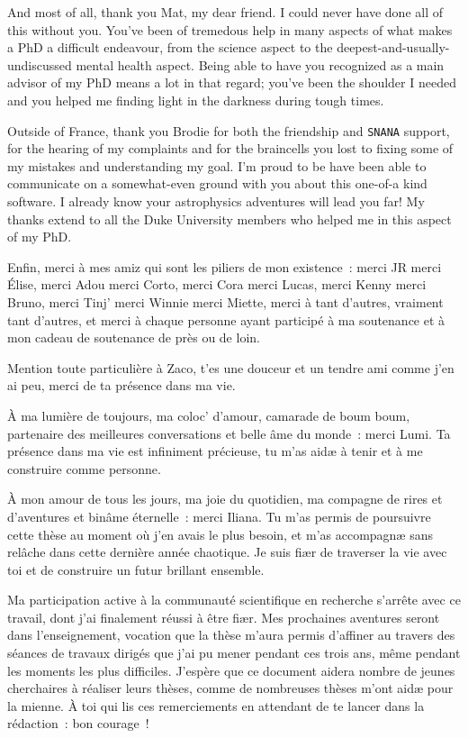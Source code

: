 \documentclass[../main/main.tex]{subfiles}
\begin{document}
And most of all, thank you Mat, my dear friend. I could never have done all of
this without you. You've been of tremedous help in many aspects of what makes a
PhD a difficult endeavour, from the science aspect to the
deepest-and-usually-undiscussed mental health aspect. Being able to have you
recognized as a main advisor of my PhD means a lot in that regard\string; you've
been the shoulder I needed and you helped me finding light in the darkness
during tough times.

Outside of France, thank you Brodie for both the friendship and \texttt{SNANA}
support, for the hearing of my complaints and for the braincells you lost to
fixing some of my mistakes and understanding my goal. I'm proud to be have been
able to communicate on a somewhat-even ground with you about this one-of-a kind
software. I already know your astrophysics adventures will lead you far\string!
My thanks extend to all the Duke University members who helped me in this aspect
of my PhD.

Enfin, merci à mes amiz qui sont les piliers de mon existence~: merci JR merci
Élise, merci Adou merci Corto, merci Cora merci Lucas, merci Kenny merci Bruno,
merci Tinj' merci Winnie merci Miette, merci à tant d'autres, vraiment tant
d'autres, et merci à chaque personne ayant participé à ma soutenance et à mon
cadeau de soutenance de près ou de loin.

Mention toute particulière à Zaco, t'es une douceur et un tendre ami comme j'en
ai peu, merci de ta présence dans ma vie.

\vfill

À ma lumière de toujours, ma coloc' d'amour, camarade de boum boum, partenaire
des meilleures conversations et belle âme du monde~: merci Lumi. Ta présence
dans ma vie est infiniment précieuse, tu m'as aidæ à tenir et à me construire
comme personne.

\vfill

À mon amour de tous les jours, ma joie du quotidien, ma compagne de rires et
d'aventures et binâme éternelle~: merci Iliana. Tu m'as permis de poursuivre
cette thèse au moment où j'en avais le plus besoin, et m'as accompagnæ sans
relâche dans cette dernière année chaotique. Je suis fiær de traverser la vie
avec toi et de construire un futur brillant ensemble.

\vfill

Ma participation active à la communauté scientifique en recherche s'arrête avec
ce travail, dont j'ai finalement réussi à être fiær. Mes prochaines aventures
seront dans l'enseignement, vocation que la thèse m'aura permis d'affiner au
travers des séances de travaux dirigés que j'ai pu mener pendant ces trois ans,
même pendant les moments les plus difficiles. J'espère que ce document aidera
nombre de jeunes cherchaires à réaliser leurs thèses, comme de nombreuses thèses
m'ont aidæ pour la mienne. À toi qui lis ces remerciements en attendant de te
lancer dans la rédaction~: bon courage~!
\end{document}
